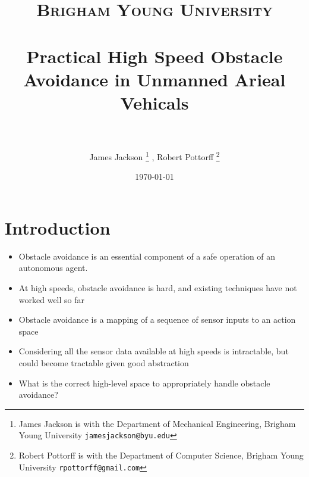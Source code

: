 \documentclass[paper=a4, fontsize=11pt]{scrartcl} %
\title{
\normalfont \normalsize
\textsc{Brigham Young University} \\ [25pt] %
\horrule{0.5pt} \\[0.4cm] %
\huge Practical High Speed Obstacle Avoidance in Unmanned Arieal Vehicals\\ %
\horrule{2pt} \\[0.5cm] %
}
\author{James Jackson%
\thanks{James Jackson is with the Department of Mechanical Engineering, Brigham Young University
        {\tt\small jamesjackson@byu.edu}}%
        , Robert Pottorff
\thanks{Robert Pottorff is with the Department of Computer Science, Brigham Young University
        {\tt\small rpottorff@gmail.com}}%
}
\date{\normalsize\today} %
\begin{document}
\maketitle %


\section{Introduction}

\begin{itemize}
	\item Obstacle avoidance is an essential component of a safe operation of an autonomous agent.
	\item At high speeds, obstacle avoidance is hard, and existing techniques have not worked well so far
\end{itemize}
	
\begin{itemize}
	\item Obstacle avoidance is a mapping of a sequence of sensor inputs to an action space
	\item Considering all the sensor data available at high speeds is intractable, but could become tractable given good abstraction
	\item What is the correct high-level space to appropriately handle obstacle avoidance?
\end{itemize}
	
\end{document}
